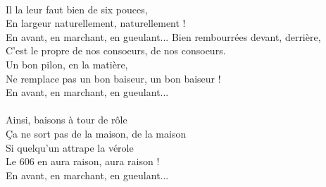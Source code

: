 \\Il la leur faut bien de six pouces,
\\En largeur naturellement, naturellement !
\\En avant, en marchant, en gueulant...
\breakpage
Bien rembourrées devant, derrière,
\\C'est le propre de nos consoeurs, de nos consoeurs.
\\Un bon pilon, en la matière,
\\Ne remplace pas un bon baiseur, un bon baiseur !
\\En avant, en marchant, en gueulant...
\\\\Ainsi, baisons à tour de rôle
\\Ça ne sort pas de la maison, de la maison
\\Si quelqu'un attrape la vérole
\\Le 606 en aura raison, aura raison !
\\En avant, en marchant, en gueulant...
\\
 
\breakpage